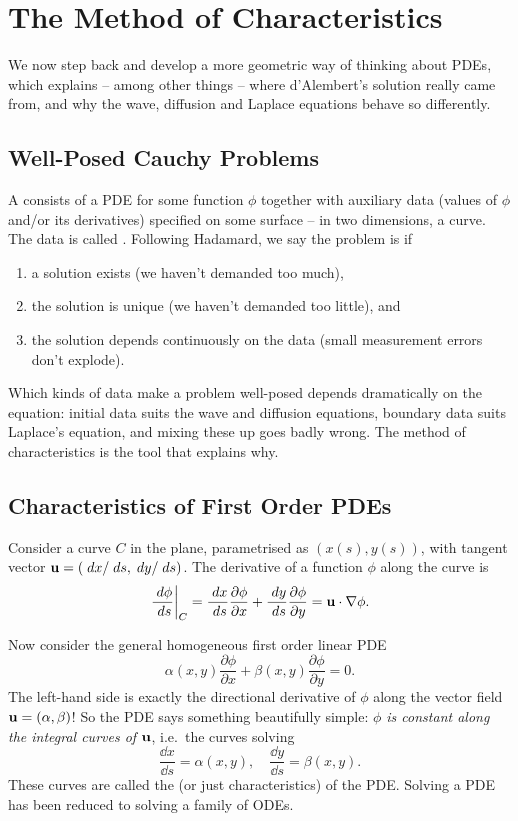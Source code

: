 \documentclass[a4paper]{scrartcl}
\begin{document}
\section{The Method of Characteristics}

We now step back and develop a more geometric way of thinking about PDEs, which explains -- among other things -- where d'Alembert's solution really came from, and why the wave, diffusion and Laplace equations behave so differently.

\subsection{Well-Posed Cauchy Problems}

A  consists of a PDE for some function $\phi$ together with auxiliary data (values of $\phi$ and/or its derivatives) specified on some surface -- in two dimensions, a curve. The data is called .
Following Hadamard, we say the problem is  if
\begin{enumerate}[label=(\roman*)]
    \item a solution exists (we haven't demanded too much),
    \item the solution is unique (we haven't demanded too little), and
    \item the solution depends continuously on the data (small measurement errors don't explode).
\end{enumerate}
Which kinds of data make a problem well-posed depends dramatically on the equation: initial data suits the wave and diffusion equations, boundary data suits Laplace's equation, and mixing these up goes badly wrong. The method of characteristics is the tool that explains why.

\subsection{Characteristics of First Order PDEs}

Consider a curve $C$ in the plane, parametrised as $(x(s), y(s))$, with tangent vector $\mathbf{u} = (\; d x/\; d s, \; d y/\; d s)$. The derivative of a function $\phi$ along the curve is
$$
\left.\frac{\; d \phi}{\; d s}\right|_C = \frac{\; d x}{\; d s} \frac{\partial \phi}{\partial x} + \frac{\; d y}{\; d s}\frac{\partial \phi}{\partial y} = \mathbf{u} \cdot \nabla \phi.
$$

Now consider the general homogeneous first order linear PDE
$$
\alpha(x, y) \frac{\partial \phi}{\partial x} + \beta(x, y) \frac{\partial \phi}{\partial y} = 0.
$$
The left-hand side is exactly the directional derivative of $\phi$ along the vector field $\mathbf{u} = (\alpha, \beta)$! So the PDE says something beautifully simple: \emph{$\phi$ is constant along the integral curves of $\mathbf{u}$}, i.e.\ the curves solving
$$
\frac{\dd x}{\dd s} = \alpha(x, y), \quad \frac{\dd y}{\dd s} = \beta(x, y).
$$
These curves are called the  (or just characteristics) of the PDE. Solving a PDE has been reduced to solving a family of ODEs.
\end{document}
